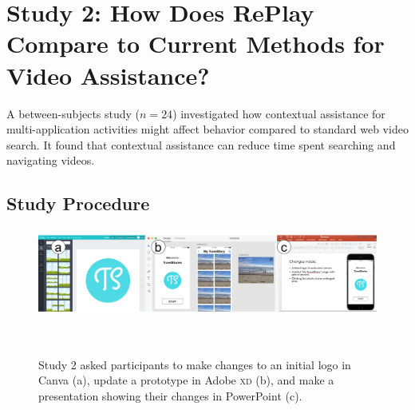 \section{Study 2: How Does RePlay Compare to Current Methods for Video Assistance?}
\label{sec:replay_study}

A between-subjects study ($n\!=\!24$) investigated how contextual assistance for multi-application activities might affect behavior compared to standard web video search. It found that contextual assistance can reduce time spent searching and navigating videos.

\subsection{Study Procedure}

\begin{figure}[b!]
\centering
\includegraphics[width=\textwidth]{replay/figures/study2_task.png}
  \caption{Study 2 asked participants to make changes to an initial logo in Canva (a), update a prototype in Adobe \textsc{xd} (b), and make a presentation showing their changes in PowerPoint (c).}~\label{fig:replay-study2-task}

\end{figure}

